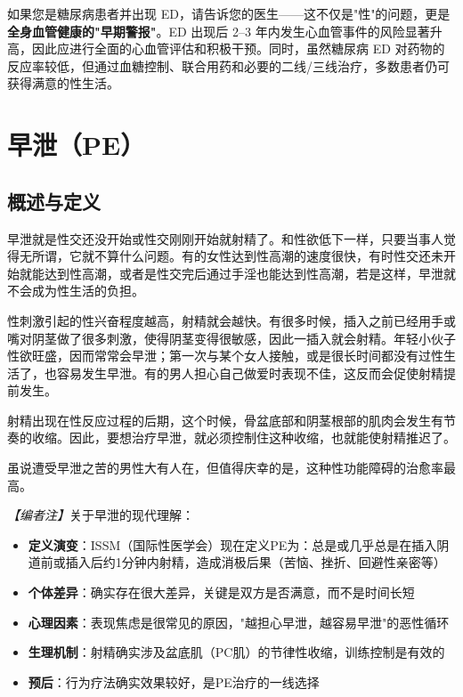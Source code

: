 \begin{tcolorbox}[colback=pink!5!white,colframe=red!50!black,title=贴心小叮咛]
如果您是糖尿病患者并出现 ED，请告诉您的医生——这不仅是"性"的问题，更是\textbf{全身血管健康的"早期警报"}。ED 出现后 2--3 年内发生心血管事件的风险显著升高，因此应进行全面的心血管评估和积极干预。同时，虽然糖尿病 ED 对药物的反应率较低，但通过血糖控制、联合用药和必要的二线/三线治疗，多数患者仍可获得满意的性生活。
\end{tcolorbox}

\section{早泄（PE）}
\subsection{概述与定义}

早泄就是性交还没开始或性交刚刚开始就射精了。和性欲低下一样，只要当事人觉得无所谓，它就不算什么问题。有的女性达到性高潮的速度很快，有时性交还未开始就能达到性高潮，或者是性交完后通过手淫也能达到性高潮，若是这样，早泄就不会成为性生活的负担。

性刺激引起的性兴奋程度越高，射精就会越快。有很多时候，插入之前已经用手或嘴对阴茎做了很多刺激，使得阴茎变得很敏感，因此一插入就会射精。年轻小伙子性欲旺盛，因而常常会早泄；第一次与某个女人接触，或是很长时间都没有过性生活了，也容易发生早泄。有的男人担心自己做爱时表现不佳，这反而会促使射精提前发生。

射精出现在性反应过程的后期，这个时候，骨盆底部和阴茎根部的肌肉会发生有节奏的收缩。因此，要想治疗早泄，就必须控制住这种收缩，也就能使射精推迟了。

虽说遭受早泄之苦的男性大有人在，但值得庆幸的是，这种性功能障碍的治愈率最高。

\noindent\textit{【编者注】}关于早泄的现代理解：
\begin{itemize}
	\item \textbf{定义演变}：ISSM（国际性医学会）现在定义PE为：总是或几乎总是在插入阴道前或插入后约1分钟内射精，造成消极后果（苦恼、挫折、回避性亲密等）
	\item \textbf{个体差异}：确实存在很大差异，关键是双方是否满意，而不是时间长短
	\item \textbf{心理因素}：表现焦虑是很常见的原因，"越担心早泄，越容易早泄"的恶性循环
	\item \textbf{生理机制}：射精确实涉及盆底肌（PC肌）的节律性收缩，训练控制是有效的
	\item \textbf{预后}：行为疗法确实效果较好，是PE治疗的一线选择
\end{itemize}

